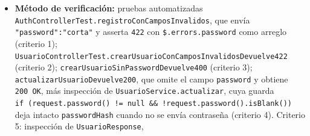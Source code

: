 \documentclass[
  spanish,
]{article}
\providecommand{\tightlist}{%
  \setlength{\itemsep}{0pt}\setlength{\parskip}{0pt}}
\begin{document}
\begin{itemize}
  \begin{enumerate}
  \def\labelenumi{\arabic{enumi}.}
  \tightlist
  \item
    Dado un registro público con contraseña de menos de 8 caracteres,
    cuando se envía, entonces la respuesta es \texttt{422} con
    \texttt{Problem\allowbreak{}Detail} de validación y el objeto \texttt{errors}
    incluye la entrada \texttt{password}.
  \item
    Dado el mismo caso en la creación administrativa de usuarios
    (\texttt{POST\ /\allowbreak{}api/\allowbreak{}usuarios}), entonces la respuesta es
    \texttt{422} con la misma estructura.
  \item
    Dada una creación administrativa \textbf{sin} contraseña, entonces
    la respuesta es \texttt{400} con \texttt{Problem\allowbreak{}Detail}: la
    contraseña es obligatoria al crear.
  \item
    Dada una actualización administrativa con contraseña vacía o
    ausente, entonces la contraseña actual se conserva sin cambios y la
    operación responde \texttt{200\ OK}.
  \item
    Ninguna respuesta de la API incluye la contraseña ni el hash.
  \item
    La contraseña admitida se almacena cifrada según REQ-NF-008.
  \end{enumerate}
\item
  \textbf{Método de verificación:} pruebas automatizadas
  \texttt{Auth\allowbreak{}Controller\allowbreak{}Test.\allowbreak{}registro\allowbreak{}Con\allowbreak{}Campos\allowbreak{}Invalidos}, que envía
  \texttt{"password":"cort\allowbreak{}a"} y asserta \texttt{422} con
  \texttt{\$.\allowbreak{}errors.\allowbreak{}password} como arreglo (criterio 1);
  \texttt{Usuario\allowbreak{}Controller\allowbreak{}Test.\allowbreak{}crear\allowbreak{}Usuario\allowbreak{}Con\allowbreak{}Campos\allowbreak{}Invalidos\allowbreak{}Devuelve422}
  (criterio 2); \texttt{crear\allowbreak{}Usuario\allowbreak{}Sin\allowbreak{}Password\allowbreak{}Devuelve400} (criterio
  3); \texttt{actualizar\allowbreak{}Usuario\allowbreak{}Devuelve200}, que omite el campo
  \texttt{password} y obtiene \texttt{200\ OK}, más inspección de
  \texttt{Usuario\allowbreak{}Service.\allowbreak{}actualizar}, cuya guarda
  \texttt{if\ (request.\allowbreak{}password()\ !=\ null\ \&\&\ !\allowbreak{}request.\allowbreak{}password().\allowbreak{}is\allowbreak{}Blank())}
  deja intacto \texttt{password\allowbreak{}Hash} cuando no se envía contraseña
  (criterio 4). Criterio 5: inspección de \texttt{Usuario\allowbreak{}Response},

\end{itemize}
\end{document}
